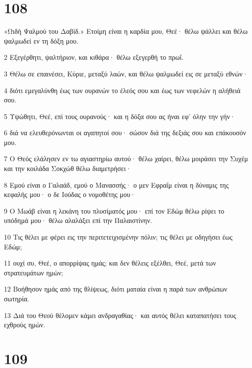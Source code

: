 \chapter{108}

\par «Ωιδή Ψαλμού του Δαβίδ.» Ετοίμη είναι η καρδία μου, Θεέ· θέλω ψάλλει και θέλω ψαλμωδεί εν τη δόξη μου.
\par 2 Εξεγέρθητι, ψαλτήριον, και κιθάρα· θέλω εξεγερθή το πρωΐ.
\par 3 Θέλω σε επαινέσει, Κύριε, μεταξύ λαών, και θέλω ψαλμωδεί εις σε μεταξύ εθνών·
\par 4 διότι εμεγαλύνθη έως των ουρανών το έλεός σου και έως των νεφελών η αλήθειά σου.
\par 5 Υψώθητι, Θεέ, επί τους ουρανούς· και η δόξα σου ας ήναι εφ' όλην την γήν·
\par 6 διά να ελευθερόνωνται οι αγαπητοί σου· σώσον διά της δεξιάς σου και επάκουσόν μου.
\par 7 Ο Θεός ελάλησεν εν τω αγιαστηρίω αυτού· θέλω χαίρει, θέλω μοιράσει την Συχέμ και την κοιλάδα Σοκχώθ θέλω διαμετρήσει·
\par 8 Εμού είναι ο Γαλαάδ, εμού ο Μανασσής· ο μεν Εφραΐμ είναι η δύναμις της κεφαλής μου· ο δε Ιούδας ο νομοθέτης μου·
\par 9 Ο Μωάβ είναι η λεκάνη του πλυσίματός μου· επί τον Εδώμ θέλω ρίψει το υπόδημά μου· θέλω αλαλάξει επί την Παλαιστίνην.
\par 10 Τις θέλει με φέρει εις την περιτετειχισμένην πόλιν; τις θέλει με οδηγήσει έως Εδώμ;
\par 11 ουχί συ, Θεέ, ο απορρίψας ημάς; και δεν θέλεις εξέλθει, Θεέ, μετά των στρατευμάτων ημών;
\par 12 Βοήθησον ημάς από της θλίψεως, διότι ματαία είναι η παρά των ανθρώπων σωτηρία.
\par 13 Διά του Θεού θέλομεν κάμει ανδραγαθίας· και αυτός θέλει καταπατήσει τους εχθρούς ημών.

\chapter{109}

